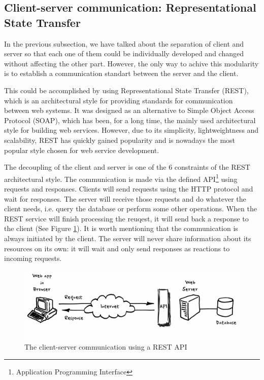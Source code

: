 \subsection{Client-server communication: Representational State Transfer}
\label{subsection:rest}

In the previous subsection, we have talked about the separation of client and server so that each one of them could be individually developed and changed without affecting the other part. However, the only way to achive this modularity is to establish a communication standart between the server and the client.

This could be accomplished by using Representational State Transfer (REST), which is an architectural style for providing standards for communication between web systems. It was designed as an alternative to Simple Object Access Protocol (SOAP), which has been, for a long time, the mainly used architectural style for building web services. However, due to its simplicity, lightweightness and scalability, REST has quickly gained popularity and is nowadays the most popular style chosen for web service development.

The decoupling of the client and server is one of the 6 constraints of the REST architectural style. The communication is made via the defined API\footnote{Application Programming Interface} using requests and responses. Clients will send requests using the HTTP protocol and wait for responses. The server will receive those requests and do whatever the client needs, i.e. query the database or perform some other operations. When the REST service will finish processing the reuqest, it will send back a response to the client (See Figure \ref{rest}). It is worth mentioning that the communication is always initiated by the client. The server will never share information about its resources on its own: it will wait and only send responses as reactions to incoming requests.

\begin{figure}[H]
    \centering
    \includegraphics[width=5in]{images/rest}
    \caption{The client-server communication using a REST API \cite{rest}}
    \label{rest}
\end{figure}

